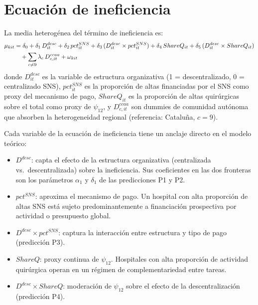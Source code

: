 \section{Ecuación de ineficiencia}
\label{sec:ecuacion_inef}

La media heterogénea del término de ineficiencia es:
\begin{align}
  \mu_{kit} &= \delta_0
    + \delta_1\, D^{desc}_{it}
    + \delta_2\, pct^{SNS}_{it}
    + \delta_3\, (D^{desc}_{it} \times pct^{SNS}_{it})
    + \delta_4\, ShareQ_{it}
    + \delta_5\, (D^{desc}_{it} \times ShareQ_{it})
    \notag \\
    &\quad + \sum_{c \neq 9} \lambda_c\, D^{ccaa}_{c,it}
    + \omega_{kit}
  \label{eq:uhet}
\end{align}
donde $D^{desc}_{it}$ es la variable de estructura organizativa (1 = descentralizado, 0 = centralizado SNS), $pct^{SNS}_{it}$ es la proporción de altas financiadas por el SNS como proxy del mecanismo de pago, $ShareQ_{it}$ es la proporción de altas quirúrgicas sobre el total como proxy de $\psi_{12}$, y $D^{ccaa}_{c,it}$ son dummies de comunidad autónoma que absorben la heterogeneidad regional (referencia: Cataluña, $c=9$).

Cada variable de la ecuación de ineficiencia tiene un anclaje directo en el modelo teórico:
\begin{itemize}
  \item $D^{desc}$: capta el efecto de la estructura organizativa (centralizada vs.\ descentralizada) sobre la ineficiencia. Sus coeficientes en las dos fronteras son los parámetros $\alpha_1$ y $\delta_1$ de las predicciones P1 y P2.
  \item $pct^{SNS}$: aproxima el mecanismo de pago. Un hospital con alta proporción de altas SNS está sujeto predominantemente a financiación prospectiva por actividad o presupuesto global.
  \item $D^{desc}\times pct^{SNS}$: captura la interacción entre estructura y tipo de pago (predicción P3).
  \item $ShareQ$: proxy continua de $\psi_{12}$. Hospitales con alta proporción de actividad quirúrgica operan en un régimen de complementariedad entre tareas.
  \item $D^{desc}\times ShareQ$: moderación de $\psi_{12}$ sobre el efecto de la descentralización (predicción P4).
\end{itemize}

